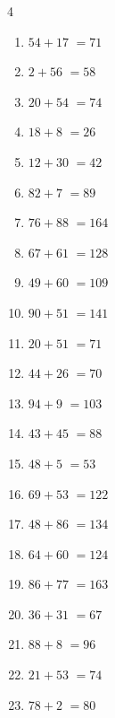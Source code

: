 \begin{multicols}{4}
\begin{enumerate}
\columnbreak %

\resetques

  \item $54+17$
        $=71$

  \item $2+56$
        $=58$

  \item $20+54$
        $=74$

  \item $18+8$
        $=26$

  \item $12+30$
        $=42$

  \item $82+7$
        $=89$

  \item $76+88$
        $=164$

  \item $67+61$
        $=128$

  \item $49+60$
        $=109$

  \item $90+51$
        $=141$

  \item $20+51$
        $=71$

  \item $44+26$
        $=70$

  \item $94+9$
        $=103$

  \item $43+45$
        $=88$

  \item $48+5$
        $=53$

  \item $69+53$
        $=122$

  \item $48+86$
        $=134$

  \item $64+60$
        $=124$

  \item $86+77$
        $=163$

  \item $36+31$
        $=67$

  \item $88+8$
        $=96$

  \item $21+53$
        $=74$

  \item $78+2$
        $=80$


\end{enumerate}
\end{multicols}
